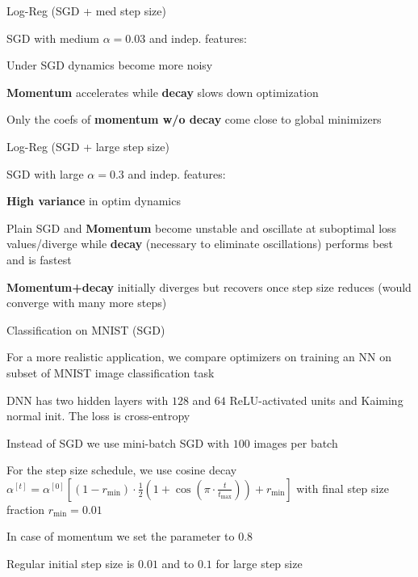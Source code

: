 \documentclass[11pt,compress,t,notes=noshow, xcolor=table]{beamer}
\begin{document}
\begin{framei}[fs=small]{Log-Reg (SGD + med step size)}
\item SGD with medium $\alpha=0.03$ and indep. features:
\item Under SGD dynamics become more noisy
\item \textbf{Momentum} accelerates while \textbf{decay} slows down optimization
\item Only the coefs of \textbf{momentum w/o decay} come close to global minimizers
\end{framei}


\begin{framei}[fs=footnotesize]{Log-Reg (SGD + large step size)}
\item SGD with large $\alpha=0.3$ and indep. features:
\item \textbf{High variance} in optim dynamics
\item Plain SGD and \textbf{Momentum} become unstable and oscillate at suboptimal loss values/diverge while \textbf{decay} (necessary to eliminate oscillations) performs best and is fastest
\item \textbf{Momentum+decay} initially diverges but recovers once step size reduces (would converge with many more steps)
\end{framei}


\begin{framei}{Classification on MNIST (SGD)}
\item For a more realistic application, we compare optimizers on training an NN on subset of MNIST image classification task
\item DNN has two hidden layers with $128$ and $64$ ReLU-activated units and Kaiming normal init. The loss is cross-entropy
\item Instead of SGD we use mini-batch SGD with $100$ images per batch
\item For the step size schedule, we use cosine decay $\alpha^{[t]} = \alpha^{[0]} \left[(1-r_{\text{min}}) \cdot \frac{1}{2}\left(1 + \cos\left(\pi \cdot \frac{t}{t_{\text{max}}}\right)\right) + r_{\text{min}}\right]$ with final step size fraction $r_{\text{min}}=0.01$
\item In case of momentum we set the parameter to $0.8$
\item Regular initial step size is $0.01$ and to $0.1$ for large step size
\end{framei}
\end{document}
